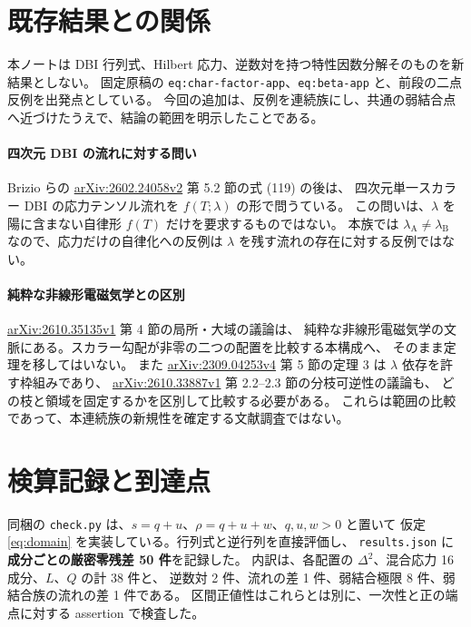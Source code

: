 \documentclass[11pt,a4paper]{article}
\begin{document}
\newpage
\section{既存結果との関係}
本ノートは DBI 行列式、Hilbert 応力、逆数対を持つ特性因数分解そのものを新結果としない。
固定原稿の \texttt{eq:char-factor-app}、\texttt{eq:beta-app} と、前段の二点反例を出発点としている。
今回の追加は、反例を連続族にし、共通の弱結合点へ近づけたうえで、結論の範囲を明示したことである。

\paragraph{四次元 DBI の流れに対する問い}
Brizio らの \href{https://arxiv.org/abs/2602.24058v2}{arXiv:2602.24058v2} 第 5.2 節の式 (119) の後は、
四次元単一スカラー DBI の応力テンソル流れを $f(T;\lambda)$ の形で問うている。
この問いは、$\lambda$ を陽に含まない自律形 $f(T)$ だけを要求するものではない。
本族では $\lambda_{\mathrm A}\ne\lambda_{\mathrm B}$ なので、応力だけの自律化への反例は
$\lambda$ を残す流れの存在に対する反例ではない。

\paragraph{純粋な非線形電磁気学との区別}
\href{https://arxiv.org/abs/2610.35135v1}{arXiv:2610.35135v1} 第 4 節の局所・大域の議論は、
純粋な非線形電磁気学の文脈にある。スカラー勾配が非零の二つの配置を比較する本構成へ、
そのまま定理を移してはいない。
また \href{https://arxiv.org/abs/2309.04253v4}{arXiv:2309.04253v4} 第 5 節の定理 3 は
$\lambda$ 依存を許す枠組みであり、
\href{https://arxiv.org/abs/2610.33887v1}{arXiv:2610.33887v1} 第 2.2--2.3 節の分枝可逆性の議論も、
どの枝と領域を固定するかを区別して比較する必要がある。
これらは範囲の比較であって、本連続族の新規性を確定する文献調査ではない。

\section{検算記録と到達点}
同梱の \texttt{check.py} は、$s=q+u$、$\rho=q+u+w$、$q,u,w>0$ と置いて
仮定 \eqref{eq:domain} を実装している。行列式と逆行列を直接評価し、
\texttt{results.json} に\textbf{成分ごとの厳密零残差 50 件}を記録した。
内訳は、各配置の $\Delta^2$、混合応力 16 成分、$L$、$Q$ の計 38 件と、
逆数対 2 件、流れの差 1 件、弱結合極限 8 件、弱結合族の流れの差 1 件である。
区間正値性はこれらとは別に、一次性と正の端点に対する assertion で検査した。
\end{document}

